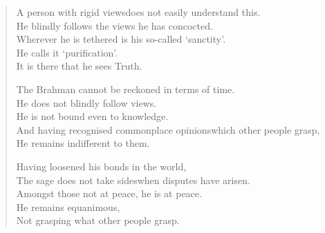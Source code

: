 \begin{verse}

 A person with rigid views\newline does not easily understand this.\\
He blindly follows the views he has concocted.\\
Wherever he is tethered is his so-called `sanctity'.\\
He calls it `purification'.\\
It is there that he sees Truth.


 The Brahman cannot be reckoned in terms of time.\\
He does not blindly follow views.\\
He is not bound even to knowledge.\\
And having recognised commonplace opinions\newline which other people grasp,\\
He remains indifferent to them.


 Having loosened his bonds in the world,\\
The sage does not take sides\newline when disputes have arisen.\\
Amongst those not at peace, he is at peace.\\
He remains equanimous,\\
Not grasping what other people grasp.



\end{verse}
